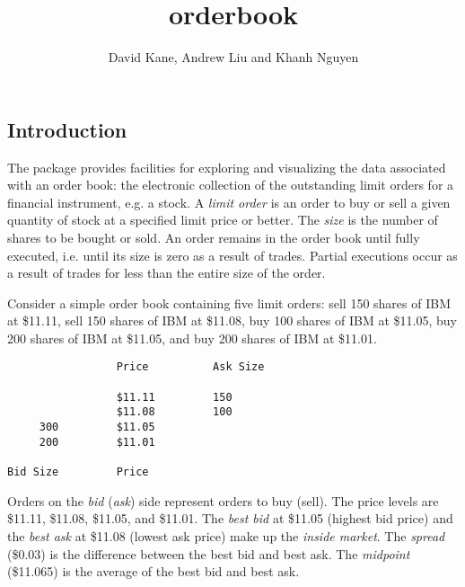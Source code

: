 \documentclass[a4paper]{report}
\begin{document}
\begin{article}

\title{orderbook}
\author{David Kane, Andrew Liu and Khanh Nguyen}


\maketitle



\section*{Introduction}

The  package provides facilities for exploring and
visualizing the data associated with an order book: the electronic
collection of the outstanding limit orders for a financial instrument,
e.g. a stock. A \emph{limit order} is an order to buy or sell a given
quantity of stock at a specified limit price or better. The
\emph{size} is the number of shares to be bought or sold.  An order
remains in the order book until fully executed, i.e. until its size is
zero as a result of trades. Partial executions occur as a result of
trades for less than the entire size of the order.

Consider a simple order book containing five limit orders: sell 150
shares of IBM at \$11.11, sell 150 shares of IBM at \$11.08, buy 100
shares of IBM at \$11.05, buy 200 shares of IBM at \$11.05, and buy
200 shares of IBM at \$11.01.

\begin{verbatim}
                 Price          Ask Size

                 $11.11         150
                 $11.08         100
     300         $11.05
     200         $11.01

Bid Size         Price
\end{verbatim}

\noindent Orders on the \emph{bid} (\emph{ask}) side represent orders to buy
(sell). The price levels are \$11.11, \$11.08, \$11.05, and
\$11.01. The \emph{best bid} at \$11.05 (highest bid price) and the
\emph{best ask} at \$11.08 (lowest ask price) make up the \emph{inside
  market}. The \emph{spread} (\$0.03) is the difference between the
best bid and best ask. The \emph{midpoint} (\$11.065) is the average
of the best bid and best ask.


\end{article}
\end{document}
